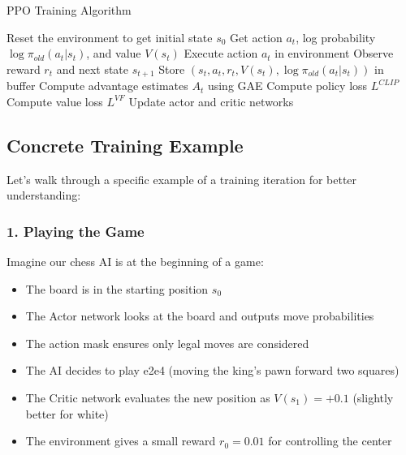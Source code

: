 \documentclass[11pt]{article}
\begin{document}
\begin{algorithm}[h]
    \caption{PPO Training Algorithm}
    \begin{algorithmic}[1]
            \State Reset the environment to get initial state $s_0$
                \State Get action $a_t$, log probability $\log \pi_{old}(a_t|s_t)$, and value $V(s_t)$
                \State Execute action $a_t$ in environment
                \State Observe reward $r_t$ and next state $s_{t+1}$
                \State Store $(s_t, a_t, r_t, V(s_t), \log \pi_{old}(a_t|s_t))$ in buffer
            \EndFor
            \State Compute advantage estimates $A_t$ using GAE
                    \State Compute policy loss $L^{CLIP}$
                    \State Compute value loss $L^{VF}$
                    \State Update actor and critic networks
                \EndFor
            \EndFor
        \EndFor
    \end{algorithmic}
\end{algorithm}

\subsection{Concrete Training Example}

Let's walk through a specific example of a training iteration for better understanding:

\subsubsection*{1. Playing the Game}

Imagine our chess AI is at the beginning of a game:

\begin{itemize}
    \item The board is in the starting position $s_0$
    \item The Actor network looks at the board and outputs move probabilities
    \item The action mask ensures only legal moves are considered
    \item The AI decides to play e2e4 (moving the king's pawn forward two squares)
    \item The Critic network evaluates the new position as $V(s_1) = +0.1$ (slightly better for white)
    \item The environment gives a small reward $r_0 = 0.01$ for controlling the center
\end{itemize}
\end{document}
